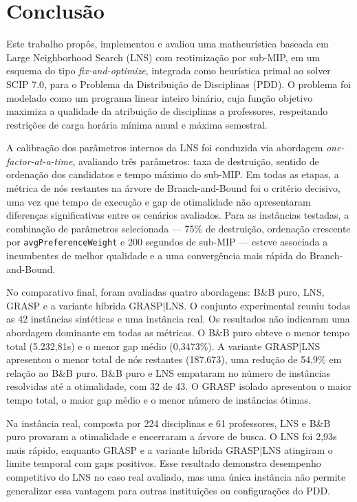 \chapter{Conclusão}

Este trabalho propôs, implementou e avaliou uma matheurística baseada em Large Neighborhood Search (LNS) com reotimização por sub-MIP, em um esquema do tipo \textit{fix-and-optimize}, integrada como heurística primal ao solver SCIP 7.0, para o Problema da Distribuição de Disciplinas (PDD). O problema foi modelado como um programa linear inteiro binário, cuja função objetivo maximiza a qualidade da atribuição de disciplinas a professores, respeitando restrições de carga horária mínima anual e máxima semestral.

A calibração dos parâmetros internos da LNS foi conduzida via abordagem \emph{one-factor-at-a-time}, avaliando três parâmetros: taxa de destruição, sentido de ordenação dos candidatos e tempo máximo do sub-MIP. Em todas as etapas, a métrica de nós restantes na árvore de Branch-and-Bound foi o critério decisivo, uma vez que tempo de execução e gap de otimalidade não apresentaram diferenças significativas entre os cenários avaliados. Para as instâncias testadas, a combinação de parâmetros selecionada --- 75\% de destruição, ordenação crescente por \texttt{avgPreferenceWeight} e 200 segundos de sub-MIP --- esteve associada a incumbentes de melhor qualidade e a uma convergência mais rápida do Branch-and-Bound.

No comparativo final, foram avaliadas quatro abordagens: B\&B puro, LNS, GRASP e a variante híbrida GRASP|LNS. O conjunto experimental reuniu todas as 42 instâncias sintéticas e uma instância real. Os resultados não indicaram uma abordagem dominante em todas as métricas. O B\&B puro obteve o menor tempo total (5.232,81s) e o menor gap médio (0,3473\%). A variante GRASP|LNS apresentou o menor total de nós restantes (187.673), uma redução de 54,9\% em relação ao B\&B puro. B\&B puro e LNS empataram no número de instâncias resolvidas até a otimalidade, com 32 de 43. O GRASP isolado apresentou o maior tempo total, o maior gap médio e o menor número de instâncias ótimas.

Na instância real, composta por 224 disciplinas e 61 professores, LNS e B\&B puro provaram a otimalidade e encerraram a árvore de busca. O LNS foi 2,93s mais rápido, enquanto GRASP e a variante híbrida GRASP|LNS atingiram o limite temporal com gaps positivos. Esse resultado demonstra desempenho competitivo do LNS no caso real avaliado, mas uma única instância não permite generalizar essa vantagem para outras instituições ou configurações do PDD.

